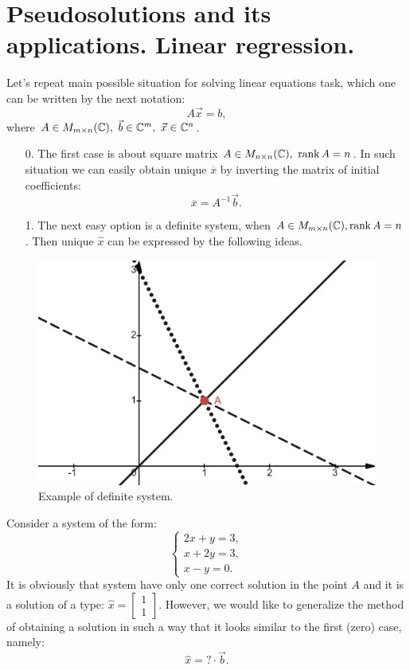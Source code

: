 \section{Pseudosolutions and its applications. Linear regression.}
\par 
Let's repeat main possible situation for solving linear equations task, which one can be written by the next notation:
\[
    A\vec{x} = b,  
\]
where $A \in M_{m\times n}(\mathbb{C}), \ \vec{b} \in \mathbb{C}^m, \ \vec{x} \in \mathbb{C}^n$.
\begin{itemize}
    \item[0. ] The first case is about square matrix $A \in M_{n\times n}(\mathbb{C}), \ \operatorname{rank} A = n$. In such situation we can easily obtain unique $\overline{x}$ by inverting the matrix of initial coefficients:
    \[
        \overline{x}  = A^{-1}\vec{b}.
    \]
    \item[1. ] The next easy option is a definite system, when $A \in M_{m\times n}(\mathbb{C}), \operatorname{rank} A=n$. Then unique $\hat{x}$ can be expressed by the following ideas.
\end{itemize}

    \begin{figure}
        \includegraphics[height=0.333\columnwidth, width=0.5\columnwidth]{lectures/images/definite_system.png}
        \caption*{\scriptsize{Example of definite system.}}
        \label{fig:definite_system}
    \end{figure}
    Consider a system of the form:
    \[
        \left\{
            \begin{array}{l}
                2x+y = 3,\\
                x+2y = 3,\\
                x-y = 0.
            \end{array}
        \right.  
    \]
    It is obviously that system have only one correct solution in the point $A$ and it is a solution of a type: $\hat{x} = \begin{bmatrix}
        1\\ 1
    \end{bmatrix}$. However, we would like to generalize the method of obtaining a solution in such a way that it looks similar to the first (zero) case, namely:
    \[
        \hat{x} = ?\cdot \vec{b}.  
    \]

